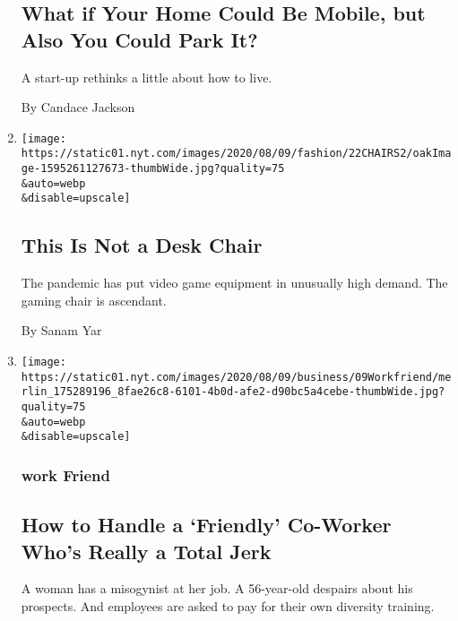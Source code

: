 \begin{enumerate}
  \hypertarget{what-if-your-home-could-be-mobile-but-also-you-could-park-it-1}{%
  \subsection{What if Your Home Could Be Mobile, but Also You Could Park
  It?}\label{what-if-your-home-could-be-mobile-but-also-you-could-park-it-1}}

  A start-up rethinks a little about how to live.

  By Candace Jackson
\item
  \href{/2020/08/07/style/gamer-chair-market-herman-miller.html}{}

  \texttt{[image: https://static01.nyt.com/images/2020/08/09/fashion/22CHAIRS2/oakImage-1595261127673-thumbWide.jpg?quality=75\\\&auto=webp\\\&disable=upscale]}

  \hypertarget{this-is-not-a-desk-chair-1}{%
  \subsection{This Is Not a Desk
  Chair}\label{this-is-not-a-desk-chair-1}}

  The pandemic has put video game equipment in unusually high demand.
  The gaming chair is ascendant.

  By Sanam Yar
\item
  \href{/2020/08/07/business/how-to-handle-a-friendly-co-worker-whos-really-a-total-jerk.html}{}

  \texttt{[image: https://static01.nyt.com/images/2020/08/09/business/09Workfriend/merlin\_175289196\_8fae26c8-6101-4b0d-afe2-d90bc5a4cebe-thumbWide.jpg?quality=75\\\&auto=webp\\\&disable=upscale]}

  \hypertarget{work-friend}{%
  \subsubsection{work Friend}\label{work-friend}}

  \hypertarget{how-to-handle-a-friendly-co-worker-whos-really-a-total-jerk}{%
  \subsection{How to Handle a `Friendly' Co-Worker Who's Really a Total
  Jerk}\label{how-to-handle-a-friendly-co-worker-whos-really-a-total-jerk}}

  A woman has a misogynist at her job. A 56-year-old despairs about his
  prospects. And employees are asked to pay for their own diversity
  training.


\end{enumerate}
